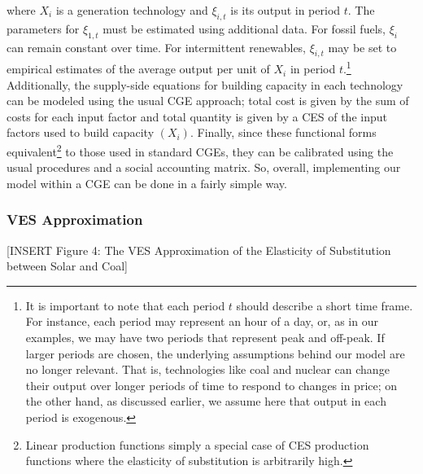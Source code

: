 \documentclass[11pt,a4paper,leqno]{extarticle}
\begin{document}
	where $X_i$ is a generation technology and $\xi_{i,t}$ is its output in period $t$. The parameters for $\xi_{1,t}$ must be estimated using additional data. For fossil fuels, $\xi_i$ can remain constant over time. For intermittent renewables, $\xi_{i,t}$ may be set to empirical estimates of the average output per unit of $X_i$ in period $t$.\footnote{ It is important to note that each period $t$ should describe a short time frame. For instance, each period may represent an hour of a day, or, as in our examples, we may have two periods that represent peak and off-peak. If larger periods are chosen, the underlying assumptions behind our model are no longer relevant. That is, technologies like coal and nuclear can change their output over longer periods of time to respond to changes in price; on the other hand, as discussed earlier, we assume here that output in each period is exogenous.}  Additionally, the supply-side equations for building capacity in each technology can be modeled using the usual  CGE approach; total cost is given by the sum of costs for each input factor and total quantity is given by a CES of the input factors used to build capacity $(X_i)$. Finally, since these functional forms equivalent\footnote{ Linear production functions simply a special case of CES production functions where the elasticity of substitution is arbitrarily high.} to those used in standard CGEs, they can be calibrated using the usual procedures and a social accounting matrix. So, overall, implementing our model within a CGE can be done in a fairly simple way. 
	
	\subsubsection{VES Approximation}
	\label{sec:VES}
	
	
	\vspace{0.15in}
	\begin{center}
		[INSERT Figure 4: The VES Approximation of the Elasticity of Substitution between Solar and Coal]
	\end{center}
	\vspace{0.15in}
	
\end{document}
